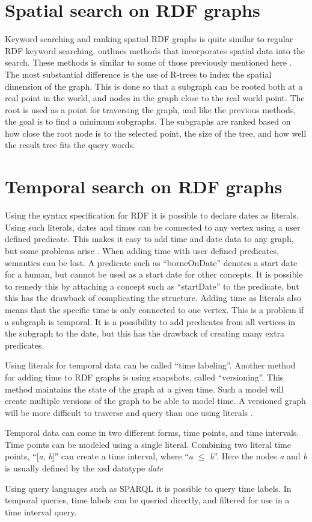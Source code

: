 \section{Spatial search on RDF graphs}
Keyword searching and ranking spatial RDF graphs is quite similar to regular RDF keyword searching. \cite{Shi:2016:TRS:2882903.2882941} outlines methods that incorporates spatial data into the search. These methods is similar to some of those previously mentioned here \citep{4812421, Elbassuoni:2011:KSO:2063576.2063615}. The most substantial difference is the use of R-trees to index the spatial dimension of the graph. This is done so that a subgraph can be rooted both at a real point in the world, and nodes in the graph close to the real world point. The root is used as a point for traversing the graph, and like the previous methods, the goal is to find a minimum subgraphs. The subgraphs are ranked based on how close the root node is to the selected point, the size of the tree, and how well the result tree fits the query words.

\section{Temporal search on RDF graphs}
Using the syntax specification for RDF \cite{beckett2004rdf} it is possible to declare dates as literals. Using such literals, dates and times can be connected to any vertex using a user defined predicate. This makes it easy to add time and date data to any graph, but some problems arise \cite{tappolet2009applied}. When adding time with user defined predicates, semantics can be lost. A predicate such as ``borneOnDate'' denotes a start date for a human, but cannot be used as a start date for other concepts. It is possible to remedy this by attaching a concept such as ``startDate'' to the predicate, but this has the drawback of complicating the structure. Adding time as literals also means that the specific time is only connected to one vertex. This is a problem if a subgraph is temporal. It is a possibility to add predicates from all vertices in the subgraph to the date, but this has the drawback of creating many extra predicates.

Using literals for temporal data can be called ``time labeling''. Another method for adding time to RDF graphs is using snapshots, called ``versioning''. This method maintains the state of the graph at a given time. Such a model will create multiple versions of the graph to be able to model time. A versioned graph will be more difficult to traverse and query than one using literals \cite{gutierrez2006introducing}. 

Temporal data can come in two different forms, time points, and time intervals. Time points can be modeled using a single literal. Combining two literal time points, ``[\emph{a}, \emph{b}]'' can create a time interval, where ``\emph{a} $\leq$ \emph{b}''. Here the nodes \emph{a} and \emph{b} is usually defined by the xsd datatype \emph{date} \cite{tappolet2009applied}

Using query languages such as SPARQL it is possible to query time labels. In temporal queries, time labels can be queried directly, and filtered for use in a time interval query. 

\glsresetall